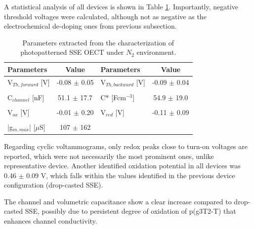 A statistical analysis of all devices is shown in Table \ref{tab:photofom}. Importantly, negative threshold voltages were calculated, although not as negative as the electrochemical de-doping ones from previous subsection.

\begin{table}[ht]
\centering
\caption{Parameters extracted from the characterization of photopatterned SSE OECT under $N_{2}$ environment.}
\begin{tabular}{l|c||l|c}
Parameters & Value & Parameters & Value \\\hline \hline
V$_{Th,forward}$ [V] & -0.08 $\pm$ 0.05 & V$_{Th,backward}$ [V] & -0.09 $\pm$ 0.04\\
& & &\\[-1em]
C$_{channel}$ [nF] & 51.1 $\pm$ 17.7 & C* [Fcm$^{-3}$] & 54.9 $\pm$ 19.0 \\
& & &\\[-1em]
V$_{ox}$ [V] & -0.01 $\pm$ 0.20 & V$_{red}$ [V] & -0.11 $\pm$ 0.09  \\
& & &\\[-1em]
|g$_{m,max}$| [$\mu$S] & 107 $\pm$ 162 &  &\\\hline
\end{tabular}
\label{tab:photofom}
\end{table}

Regarding cyclic voltammograms, only redox peaks close to turn-on voltages are reported, which were not necessarily the most prominent ones, unlike representative device. Another identified oxidation potential in all devices was 0.46 $\pm$ 0.09 V, which falls within the values identified in the previous device configuration (drop-casted SSE).

The channel and volumetric capacitance show a clear increase compared to drop-casted SSE, possibly due to persistent degree of oxidation of p(g3T2-T) that enhances channel conductivity. 


